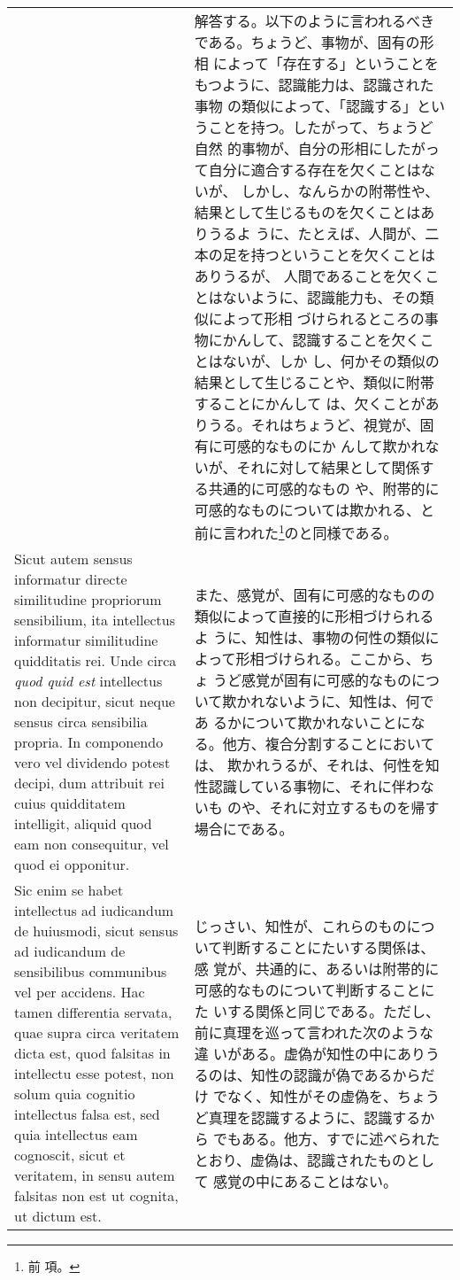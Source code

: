 \documentclass[paper=a4paper,fontsize=10pt,jafontsize=9pt,titlepage]{jlreq}
\begin{document}
\begin{longtable}{p{21em}p{21em}}
&

解答する。以下のように言われるべきである。ちょうど、事物が、固有の形相
によって「存在する」ということをもつように、認識能力は、認識された事物
の類似によって、「認識する」ということを持つ。したがって、ちょうど自然
的事物が、自分の形相にしたがって自分に適合する存在を欠くことはないが、
しかし、なんらかの附帯性や、結果として生じるものを欠くことはありうるよ
うに、たとえば、人間が、二本の足を持つということを欠くことはありうるが、
人間であることを欠くことはないように、認識能力も、その類似によって形相
づけられるところの事物にかんして、認識することを欠くことはないが、しか
し、何かその類似の結果として生じることや、類似に附帯することにかんして
は、欠くことがありうる。それはちょうど、視覚が、固有に可感的なものにか
んして欺かれないが、それに対して結果として関係する共通的に可感的なもの
や、附帯的に可感的なものについては欺かれる、と前に言われた\footnote{前
項。}のと同様である。

\\


Sicut autem sensus informatur directe similitudine propriorum
sensibilium, ita intellectus informatur similitudine quidditatis
rei. Unde circa {\itshape quod quid est} intellectus non decipitur,
sicut neque sensus circa sensibilia propria.  In componendo vero vel
dividendo potest decipi, dum attribuit rei cuius quidditatem
intelligit, aliquid quod eam non consequitur, vel quod ei opponitur.


&


また、感覚が、固有に可感的なものの類似によって直接的に形相づけられるよ
 うに、知性は、事物の何性の類似によって形相づけられる。ここから、ちょ
 うど感覚が固有に可感的なものについて欺かれないように、知性は、何であ
 るかについて欺かれないことになる。他方、複合分割することにおいては、
 欺かれうるが、それは、何性を知性認識している事物に、それに伴わないも
 のや、それに対立するものを帰す場合にである。



\\

Sic enim se habet intellectus ad iudicandum de huiusmodi, sicut sensus
ad iudicandum de sensibilibus communibus vel per accidens. Hac tamen
differentia servata, quae supra circa veritatem dicta est, quod
falsitas in intellectu esse potest, non solum quia cognitio
intellectus falsa est, sed quia intellectus eam cognoscit, sicut et
veritatem, in sensu autem falsitas non est ut cognita, ut dictum est.


&

じっさい、知性が、これらのものについて判断することにたいする関係は、感
 覚が、共通的に、あるいは附帯的に可感的なものについて判断することにた
 いする関係と同じである。ただし、前に真理を巡って言われた次のような違
 いがある。虚偽が知性の中にありうるのは、知性の認識が偽であるからだけ
 でなく、知性がその虚偽を、ちょうど真理を認識するように、認識するから
 でもある。他方、すでに述べられたとおり、虚偽は、認識されたものとして
 感覚の中にあることはない。


\end{longtable}
\end{document}
